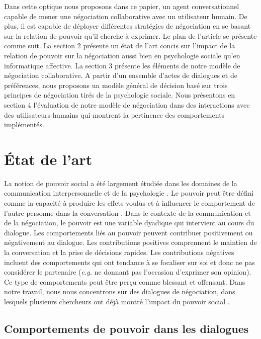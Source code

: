 \documentclass [french]{sig-alternate-05-2015}
\begin{document}
	Dans cette optique nous proposons dans ce papier, un agent conversationnel capable de mener une négociation collaborative avec un utilisateur humain. De plus, il est capable de déployer différentes stratégies de négociation en se basant sur la relation de pouvoir qu'il cherche à exprimer. Le plan de l'article se présente comme suit. La section 2 présente un état de l'art concis sur l'impact de la relation de pouvoir sur la négociation aussi bien en psychologie sociale qu'en informatique affective.  La section 3 présente les éléments de notre modèle de négociation collaborative. A partir d'un ensemble d'actes de dialogues et de préférences, nous proposons un modèle général de décision basé sur trois principes de négociation tirés de la psychologie sociale. Nous présentons en section 4 l'évaluation de notre modèle de négociation dans des interactions avec des utilisateurs humains qui montrent la pertinence des comportements implémentés. 
	
	\section{État de l'art}
		La notion de pouvoir social a été largement étudiée dans les domaines de la communication interpersonnelle et de la psychologie \cite{kecskes2013research}. Le pouvoir peut être défini comme la capacité à produire les effets voulus et à influencer le comportement de l'autre personne dans la conversation \cite {dunbar2005perceptions}. Dans le contexte de la communication et de la négociation, le pouvoir est une variable dyadique qui intervient au cours du dialogue.
		Les comportements liés au pouvoir peuvent contribuer positivement ou négativement au dialogue. Les contributions positives comprennent le maintien de la conversation et la prise de décisions rapides. Les contributions négatives incluent des comportements qui ont tendance à se focaliser sur soi et donc ne pas considérer le partenaire (\emph {e.g.} ne donnant pas l'occasion d'exprimer son opinion). Ce type de comportements peut être perçu comme blessant et offensant. Dans notre travail, nous nous concentrons sur des dialogues de négociation, dans lesquels plusieurs chercheurs ont déjà montré l'impact du pouvoir social \cite {de2004influence, burgoonnonverbal}.
	
		\subsection{Comportements de pouvoir dans les dialogues}
		\label{sec:domDialogue}
	
\end{document}
